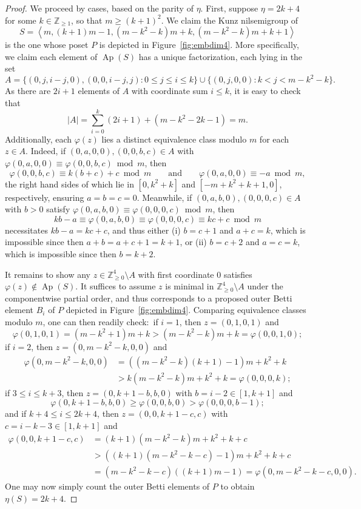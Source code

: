 \documentclass[ALCO]{cedram}
\newcommand\ZZ{\mathbb{Z}}
\DeclareMathOperator\Ap{Ap}
\begin{document}
\begin{proof}
We proceed by cases, based on the parity of $\eta$.  First, suppose $\eta = 2k + 4$ for some $k \in \ZZ_{\ge 1}$, so that $m \geq (k+1)^2$.  We claim the Kunz nilsemigroup of
$$S = \left\langle m,(k+1)m - 1,  (m-k^2-k)m +  k, (m-k^2-k)m +  k+1\right\rangle$$
is the one whose poset $P$ is depicted in Figure~\ref{fig:embdim4}.  More specifically, we claim each element of $\Ap(S)$ has a unique factorization, each lying in the set 
$$A = \{(0, j, i-j, 0), (0, 0, i-j, j) : 0 \le j \le i \le k\} 
\cup \{(0, j, 0, 0) : k < j < m - k^2 - k\}.$$
As there are $2i + 1$ elements of $A$ with coordinate sum $i \le k$, it is easy to check that
$$|A| = \sum_{i=0}^{k} (2i+1) + (m - k^2 - 2k - 1) = m.$$
Additionally, each $\varphi(z)$ lies a distinct equivalence class modulo $m$ for each $z \in A$.  Indeed, if $(0,a,0,0), (0,0,b,c) \in A$ with $\varphi(0,a,0,0) \equiv \varphi(0,0,b,c) \bmod m$, then 
$$\varphi(0,0,b,c) \equiv k(b + c) + c \bmod m
\qquad \text{and} \qquad
\varphi(0,a,0,0) \equiv -a \bmod m,$$
the right hand sides of which lie in $[0, k^2 + k]$ and $[-m + k^2 + k + 1, 0]$, respectively, ensuring $a = b = c = 0$.  Meanwhile, if $(0,a,b,0), (0,0,0,c) \in A$ with $b > 0$ satisfy $\varphi(0,a,b,0) \equiv \varphi(0,0,0,c) \bmod m$, then 
$$kb - a \equiv \varphi(0,a,b,0) \equiv \varphi(0,0,0,c) \equiv kc + c \bmod m$$
necessitates $kb - a = kc + c$, and thus either (i) $b = c + 1$ and $a + c = k$, which is impossible since then $a + b = a + c + 1 = k + 1$, or (ii) $b = c + 2$ and $a = c = k$, which is impossible since then $b = k + 2$.  

It remains to show any $z \in \ZZ_{\ge 0}^4 \setminus A$ with first coordinate 0 satisfies $\varphi(z) \notin \Ap(S)$.  It suffices to assume $z$ is minimal in $\ZZ_{\ge 0}^4 \setminus A$ under the componentwise partial order, and thus corresponds to a proposed outer Betti element $B_i$ of $P$ depicted in Figure~\ref{fig:embdim4}.  
Comparing equivalence classes modulo $m$, one can then readily check:\ if $i = 1$, then $z = (0,1,0,1)$ and
$$\varphi(0,1,0,1) = (m - k^2 + 1)m + k > (m - k^2 - k)m + k = \varphi(0,0,1,0);$$
if $i = 2$, then $z = (0, m - k^2-k, 0, 0)$ and 
\begin{align*}
    \varphi(0, m - k^2 - k, 0, 0) 
    &= ((m - k^2 - k)(k+1) - 1)m + k^2 + k \\
    &> k(m-k^2-k)m +  k^2 + k = \varphi(0, 0, 0, k);
\end{align*}
if $3 \le i \le k + 3$, then $z = (0, k+1-b, b, 0)$ with $b = i - 2 \in [1, k+1]$ and 
$$\varphi(0, k + 1 - b, b, 0) \ge \varphi(0, 0, b, 0) > \varphi(0, 0, 0, b - 1);$$
and if $k + 4 \le i \le 2k + 4$, then $z = (0, 0, k + 1 - c, c)$ with $c = i - k - 3 \in [1, k+1]$ and
\begin{align*}
    \varphi(0,0,k+1-c,c) 
    &= (k+1)(m-k^2-k)m + k^2 + k + c \\
    &> ((k+1)(m -k^2-k-c) - 1)m + k^2 + k + c \\
    &= (m -k^2-k-c)((k+1)m-1) = \varphi(0,m - k^2-k - c,0,0).
\end{align*}
One may now simply count the outer Betti elements of $P$ to obtain $\eta(S) = 2k + 4$.  


\end{proof}
\end{document}
